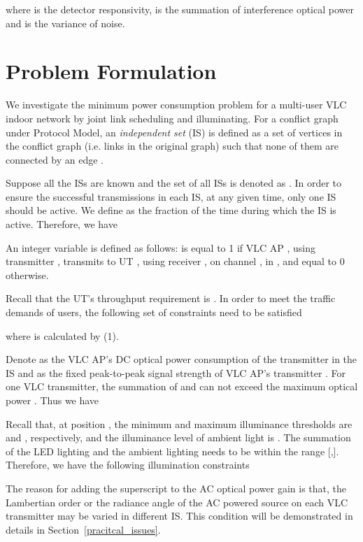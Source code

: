 \documentclass[10pt,journal]{IEEEtran}
\begin{document}
where  is the detector responsivity,  is the summation of interference optical power and  is the variance of noise.





\section{Problem Formulation}\label{problem_formulation}
We investigate the minimum power consumption problem for a multi-user VLC indoor network by joint link scheduling and illuminating. For a conflict graph under Protocol Model, an {\it independent set} (IS)  is defined as a set of vertices in the conflict graph (i.e. links in the original graph) such that none of them are connected by an edge \cite{diestel2005graph}.


Suppose all the ISs are known and the set of all ISs is denoted as . In order to ensure the successful transmissions in each IS, at any given time, only one IS should be active. We define  as the fraction of the time during which the  IS is active. Therefore, we have


An integer variable is defined as follows:  is equal to 1 if VLC AP , using transmitter , transmits to UT , using receiver , on channel , in , and equal to 0 otherwise.

Recall that the  UT's throughput requirement is . In order to meet the traffic demands of users, the following set of constraints need to be satisfied

where  is calculated by (1).

Denote  as the  VLC AP's DC optical power consumption of the transmitter  in the  IS and  as the fixed peak-to-peak signal strength of  VLC AP's transmitter . For one VLC transmitter, the summation of  and  can not exceed the maximum optical power . Thus we have


Recall that, at position , the minimum and maximum illuminance thresholds are  and , respectively, and the illuminance level of ambient light is . The summation of the LED lighting and the ambient lighting needs to be within the range [,]. Therefore, we have the following illumination constraints

The reason for adding the superscript  to the AC optical power gain is that, the Lambertian order or the radiance angle of the AC powered source on each VLC transmitter may be varied in different IS. This condition will be demonstrated in details in Section~\ref{pracitcal_issues}.
\end{document}
